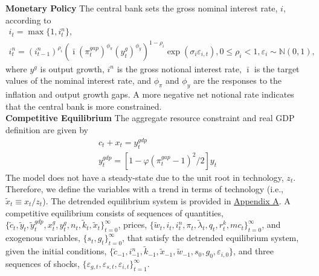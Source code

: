 \documentclass[12pt, final]{article}
\begin{document}
\noindent
\textbf{Monetary Policy} The central bank sets the gross nominal interest rate, $i$, according to
\begin{gather}
    \label{eq:15}
    i_t=\max\{1,i_t^n\},\\
      \label{eq:16}
  i_t^n=(i^n_{t-1})^{\rho_i}(\bar{\imath}(\pi^{gap}_t)^{\phi_\pi}(y^{g}_{t})^{\phi_y})^{1-\rho_i}\exp(\sigma_i\varepsilon_{i,t}), 0 \leq \rho_i < 1, \varepsilon_i \sim \mathds{N}(0,1),
  \end{gather}
where $y^{g}$ is output growth, $i^n$ is the gross notional interest rate, $\bar{\imath}$ is the target values of the nominal interest rate, and $\phi_\pi$ and $\phi_y$ are the responses to the inflation and output growth gaps. A more negative net notional rate indicates that the central bank is more constrained.\\

\noindent
\textbf{Competitive Equilibrium} The aggregate resource constraint and real GDP definition are given by
\begin{gather}
  c_t + x_t = y_t^{gdp}\\
  y_t^{gdp} = [1 - \varphi(\pi_t^{gap}-1)^2/2]y_t
\end{gather}
The model does not have a steady-state due to the unit root in technology, $z_t$. Therefore, we define the variables with a trend in terms of technology (i.e., $\tilde{x}_t \equiv x_t/z_t$). The detrended equilibrium system is provided in \hyperlink{Appendix A}{Appendix A}. A competitive equilibrium consists of sequences of quantities, $\{\tilde{c}_t, \tilde{y}_t, \tilde{y}_t^{gdp}, x^g_t, y^g_t, n_t, \tilde{k}_t, \tilde{x}_t\}_{t=0}^\infty$, prices, $\{\tilde{w}_t, i_t, i^n_t, \pi_t, \tilde{\lambda}_t, q_t, r^k_t, mc_t\}_{t=0}^\infty$, and exogenous variables, $\{s_t,g_t\}_{t=0}^\infty$, that satisfy the detrended equilibrium system, given the initial conditions, $\{\tilde{c}_{-1}, i^n_{-1}, \tilde{k}_{-1}, \tilde{x}_{-1}, \tilde{w}_{-1}, s_0, g_0, \varepsilon_{i,0}\}$, and three sequences of shocks, $\{\varepsilon_{g,t}, \varepsilon_{s,t}, \varepsilon_{i,t}\}_{t=1}^\infty$.
\end{document}
